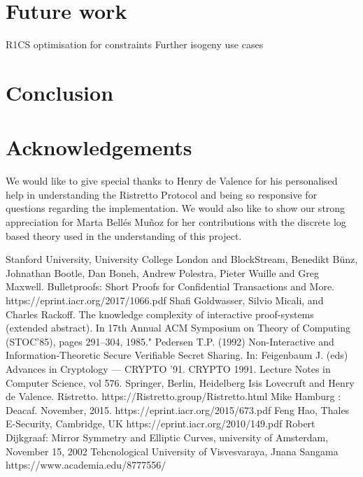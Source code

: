 \documentclass{article}
\begin{document}
\section{Future work}
R1CS optimisation for constraints 
Further isogeny use cases 

\section{Conclusion}
 
\section{Acknowledgements}
We would like to give special thanks to Henry de Valence for his personalised help in understanding the Ristretto Protocol and being so responsive for questions regarding the implementation. We would also like to show our strong appreciation for Marta Bellés Muñoz for her contributions with the discrete log based theory used in the understanding of this project. 


\newpage



\begin{thebibliography}{99}

 Stanford University, University College London and BlockStream, Benedikt Bünz, Johnathan Bootle, Dan Boneh, Andrew Polestra, Pieter Wuille and Greg Maxwell. Bulletproofs: Short Proofs for Confidential Transactions and More.\\ https://eprint.iacr.org/2017/1066.pdf
 Shafi Goldwasser, Silvio Micali, and Charles Rackoff. The knowledge complexity of interactive
proof-systems (extended abstract). In 17th Annual ACM Symposium on Theory of Computing
(STOC’85), pages 291–304, 1985."
 Pedersen T.P. (1992) Non-Interactive and Information-Theoretic Secure Verifiable Secret Sharing. In: Feigenbaum J. (eds) Advances in Cryptology — CRYPTO ’91. CRYPTO 1991. Lecture Notes in Computer Science, vol 576. Springer, Berlin, Heidelberg
 Isis Lovecruft and Henry de Valence. Ristretto. https://Ristretto.group/Ristretto.html
 Mike Hamburg : Deacaf. November, 2015. https://eprint.iacr.org/2015/673.pdf
 Feng Hao, Thales E-Security, Cambridge, UK https://eprint.iacr.org/2010/149.pdf
Robert Dijkgraaf: Mirror Symmetry and Elliptic Curves, university of Amsterdam, November 15, 2002
 Tehcnological University of Visvesvaraya, Jnana Sangama https://www.academia.edu/8777556/

\end{thebibliography}
\end{document}
